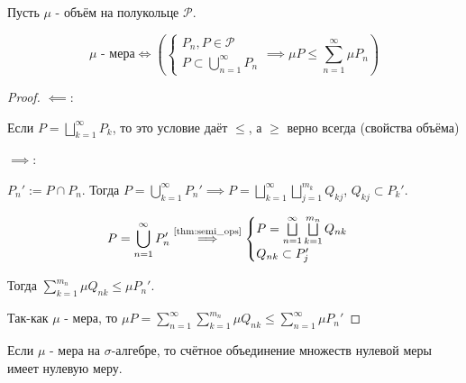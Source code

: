 \begin{theorem} \thmslashn

    Пусть $\mu$ - объём на полукольце $\mathcal{P}$.

    \begin{equation*}
        \mu \text{ - мера} \iff 
        \left(\begin{cases}
            P_{n}, P\in \mathcal{P}\\
            P \subset \bigcup\limits_{n=1}^{\infty} P_{n}
    \end{cases} \implies \mu P \le \sum\limits_{n=1}^{\infty} \mu P_{n}\right)
    \end{equation*}

    \begin{proof} \thmslashn
    
        $\impliedby$:

        Если $P = \bigsqcup\limits_{k=1}^{\infty} P_{k}$, то это условие даёт $\le $, а $\ge $ верно всегда (свойства объёма)

        $\implies$:

        $P_{n}' := P\cap P_{n}$. Тогда $P = \bigcup\limits_{k=1}^{\infty} P_{n}' \implies P = \bigsqcup\limits_{k=1}^{\infty} \bigsqcup\limits_{j=1}^{m_{k}} Q_{kj}$, $Q_{kj} \subset P_{k}'$.

        \begin{equation*}
            P = \bigcup\limits_{n=1}^{\infty} P_{n}' \overset{\text{\autoref{thm:semi_ops}}}{\implies}
            \begin{cases}
                P = \bigsqcup\limits_{n=1}^{\infty} \bigsqcup\limits_{k=1}^{m_{n}} Q_{nk}\\
                Q_{nk} \subset P_{j}'
            \end{cases}
        \end{equation*}

        Тогда $\sum\limits_{k=1}^{m_{n}} \mu Q_{nk} \le \mu P_{n}' $.

        Так-как $\mu$ - мера, то $\mu P = \sum\limits_{n=1}^{\infty} \sum\limits_{k=1}^{m_n} \mu Q_{nk} \le \sum\limits_{n=1}^{\infty} \mu P_{n}'$
    \end{proof}
\end{theorem}
\begin{consequence} \thmslashn

    Если $\mu$ - мера на $\sigma$-алгебре, то счётное объединение множеств нулевой меры имеет нулевую меру.
\end{consequence}
